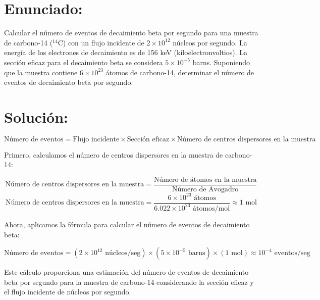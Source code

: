 \documentclass{article}
\begin{document}
\section*{Enunciado:}

Calcular el número de eventos de decaimiento beta por segundo para una muestra de carbono-14 ($^{14}$C) con un flujo incidente de $2 \times 10^{12}$ núcleos por segundo. La energía de los electrones de decaimiento es de 156 keV (kiloelectronvoltios). La sección eficaz para el decaimiento beta se considera $5 \times 10^{-5}$ barns. Suponiendo que la muestra contiene $6 \times 10^{23}$ átomos de carbono-14, determinar el número de eventos de decaimiento beta por segundo.

\section*{Solución:}

\[
\text{Número de eventos} = \text{Flujo incidente} \times \text{Sección eficaz} \times \text{Número de centros dispersores en la muestra}
\]

Primero, calculamos el número de centros dispersores en la muestra de carbono-14:

\[
\text{Número de centros dispersores en la muestra} = \frac{\text{Número de átomos en la muestra}}{\text{Número de Avogadro}}
\]
\[
\text{Número de centros dispersores en la muestra} = \frac{6 \times 10^{23} \text{ átomos}}{6.022 \times 10^{23} \text{ átomos/mol}} \approx 1 \text{ mol}
\]

Ahora, aplicamos la fórmula para calcular el número de eventos de decaimiento beta:

\[
\text{Número de eventos} = (2 \times 10^{12} \text{ núcleos/seg}) \times (5 \times 10^{-5} \text{ barns}) \times (1 \text{ mol}) \approx 10^{-4} \text{ eventos/seg}
\]

Este cálculo proporciona una estimación del número de eventos de decaimiento beta por segundo para la muestra de carbono-14 considerando la sección eficaz y el flujo incidente de núcleos por segundo.
\end{document}
